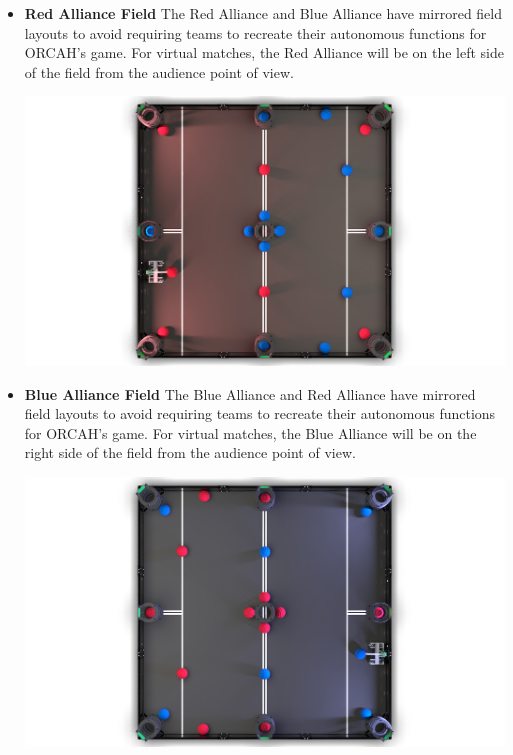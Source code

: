 \documentclass[letterpaper, 12pt]{article}
\begin{document}
\begin{itemize}[label={}]
\newpage

\item\textbf{Red Alliance Field}
The Red Alliance and Blue Alliance have mirrored field layouts to avoid requiring teams to recreate their autonomous functions for ORCAH’s game.  For virtual matches, the Red Alliance will be on the left side of the field from the audience point of view.

\begin{center}
\includegraphics[scale=0.25]{redfield}
\end{center}

\item\textbf{Blue Alliance Field}
The Blue Alliance and Red Alliance have mirrored field layouts to avoid requiring teams to recreate their autonomous functions for ORCAH’s game.  For virtual matches, the Blue Alliance will be on the right side of the field from the audience point of view. 

\begin{center}
\includegraphics[scale=0.25]{bluefield}
\end{center}


\end{itemize}
\end{document}
